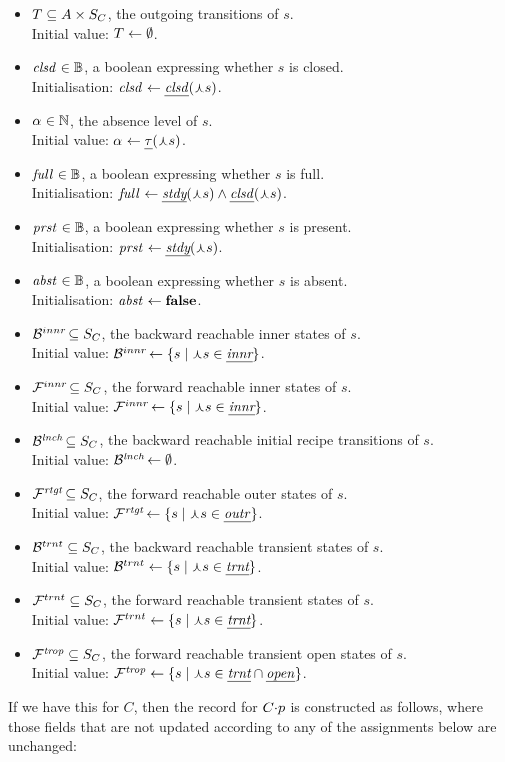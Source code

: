 \documentclass{article}
\begin{document}
\begin{itemize}
\item $T_{\smash{\mkern2mu}}\subseteq A\times S_C$, the outgoing transitions of $s$. \\ 
	Initial value: $T_{\smash{\mkern2mu}} \gets \emptyset$.
\item $\mathit{clsd}_{}\in \mathbb{B}$, a boolean expressing whether $s$ is closed. \\ 
	Initialisation: $\Closed \gets \pClosed(\prm s)$.
\item $\alpha_{}\in \mathbb{N}$, the absence level of $s$. \\ 
	Initial value: $\ALevel \gets \pTLevel(\prm s)$.
\item $\Full\in \boolB$, a boolean expressing whether $s$ is full. \\ 
	Initialisation: $\Full \gets \pSteady(\prm s) \wedge \pClosed(\prm s)$.
\item $\mathit{prst}_{\!\,}\in \mathbb{B}$, a boolean expressing whether $s$ is present. \\ 
	Initialisation: $\Present \gets \pSteady(\prm s)$.
\item $\mathit{abst}_{}\in \mathbb{B}$, a boolean expressing whether $s$ is absent. \\ 
	Initialisation: $\mathit{abst}_{} \gets \mathbf{false}$.
\item $\BackIn\subseteq S_C$, the backward reachable inner states of $s$. \\ 
	Initial value: $\BackIn \gets \gensetof{s}{\prm s\in \pInner}$.
\item $\mathcal{F}^{\smash{innr\!}}_{\smash{\!\mkern2mu}}\subseteq S_C$, the forward reachable inner states of $s$. \\ 
	Initial value: $\ForwIn \gets \gensetof{s}{\prm s\in \pInner}$.
\item $\BackOut\subseteq S_C$, the backward reachable initial recipe transitions of $s$. \\ 
	Initial value: $\BackOut \gets \emptyset$.
\item $\mathcal{F}^{\smash{\mathit{rtgt}\!}}_{\smash{\!\mkern2mu}}\subseteq S_C$, the forward reachable outer states of $s$. \\ 
	Initial value: $\ForwOut \gets \gensetof{s}{\prm s\in \pOuter}$.
\item $\mathcal{B}^{\smash{trnt}}_{\smash{\mkern-2mu}}\subseteq S_C$, the backward reachable transient states of $s$. \\ 
	Initial value: $\BackTrans \gets \gensetof{s}{\prm s\in \pTransient}$.
\item $\mathcal{F}^{trnt}_{\smash{\!\mkern2mu}}\subseteq S_C$, the forward reachable transient states of $s$. \\ 
	Initial value: $\ForwTrans \gets \gensetof{s}{\prm s\in \pTransient}$.
\item $\mathcal{F}^{\mathit{trop}}_{\smash{\!\mkern2mu}}\subseteq S_C$, the forward reachable transient open states of $s$. \\ 
	Initial value: $\ForwTrOp \gets \gensetof{s}{\prm s\in \pTransient\cap \pOpen}$.
\end{itemize}
%
If we have this for $C$, then the record for ${C}{\cdot}{p}$ is constructed as follows, where those fields that are not updated according to any of the assignments below are unchanged:
\end{document}
